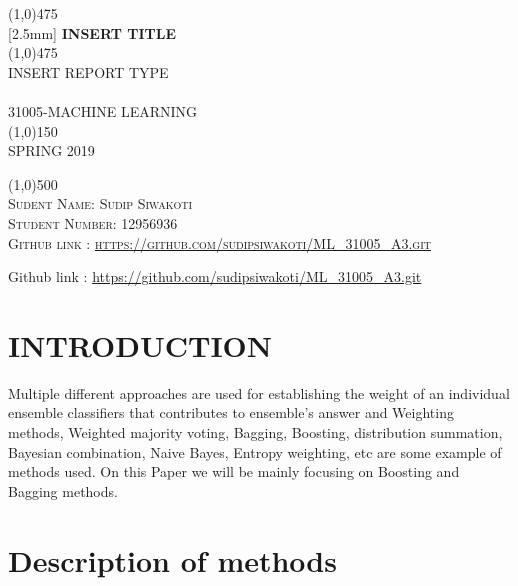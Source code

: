 \documentclass{article}
\begin{document}
\begin{titlepage}
	\begin{center}
    \line(1,0){475}\\
   [2.5mm]
    \huge{\bfseries INSERT TITLE}\\
    \line(1,0){475}\\
    [3mm]
    \textsc{\Large INSERT REPORT TYPE}\\
    [6cm]
    \textsc{\small \\
    [1mm]
    31005-MACHINE LEARNING\\
    \line(1,0){150}\\
    SPRING 2019}\\
    [6.cm]
    \end{center}
    \begin{flushleft}
    \line(1,0){500}\\
    \textsc{\large Sudent Name: Sudip Siwakoti \\Student Number: 12956936\\ Github link : \url {https://github.com/sudipsiwakoti/ML_31005_A3.git} }
    \end{flushleft}
    \begin{flushleft}
    Github link : \url {https://github.com/sudipsiwakoti/ML\_31005\_A3.git} 
    \end{flushleft}
    \lipsum[0]
\end{titlepage}
\tableofcontents
\thispagestyle{empty}
\cleardoublepage
\setcounter{page}{1}

\section{INTRODUCTION}\label{sec:intor}


Multiple different approaches are used for establishing the weight of an individual ensemble classifiers that contributes to ensemble’s answer and Weighting methods, Weighted majority voting, Bagging, Boosting, distribution summation, Bayesian combination, Naive Bayes, Entropy weighting, etc are some example of methods used. On this Paper we will be mainly focusing on Boosting and Bagging methods.
\section{Description of methods}
\end{document}
